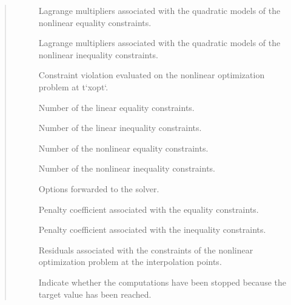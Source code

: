 \documentclass[letterpaper,10pt,english]{sphinxmanual}
\begin{document}
\begin{fulllineitems}
\begin{quote}
\begin{description}
\begin{description}
\item[{}] \leavevmode
\sphinxAtStartPar
Lagrange multipliers associated with the quadratic models of the nonlinear equality constraints.

\item[{}] \leavevmode
\sphinxAtStartPar
Lagrange multipliers associated with the quadratic models of the nonlinear inequality constraints.

\item[{}] \leavevmode
\sphinxAtStartPar
Constraint violation evaluated on the nonlinear optimization problem at t`xopt`.

\item[{}] \leavevmode
\sphinxAtStartPar
Number of the linear equality constraints.

\item[{}] \leavevmode
\sphinxAtStartPar
Number of the linear inequality constraints.

\item[{}] \leavevmode
\sphinxAtStartPar
Number of the nonlinear equality constraints.

\item[{}] \leavevmode
\sphinxAtStartPar
Number of the nonlinear inequality constraints.

\item[{}] \leavevmode
\sphinxAtStartPar
Options forwarded to the solver.

\item[{}] \leavevmode
\sphinxAtStartPar
Penalty coefficient associated with the equality constraints.

\item[{}] \leavevmode
\sphinxAtStartPar
Penalty coefficient associated with the inequality constraints.

\item[{}] \leavevmode
\sphinxAtStartPar
Residuals associated with the constraints of the nonlinear optimization problem at the interpolation points.

\item[{}] \leavevmode
\sphinxAtStartPar
Indicate whether the computations have been stopped because the target value has been reached.


\end{description}
\end{description}
\end{quote}
\end{fulllineitems}
\end{document}
